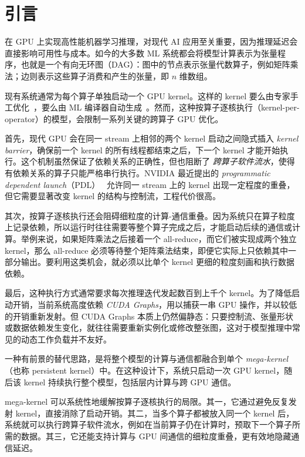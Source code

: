 \section{引言}
\label{sec:intro}
在 GPU 上实现高性能机器学习推理，对现代 AI 应用至关重要，因为推理延迟会直接影响可用性与成本。如今的大多数 ML 系统都会将模型计算表示为张量程序，也就是一个有向无环图（DAG）：图中的节点表示张量代数算子，例如矩阵乘法；边则表示这些算子消费和产生的张量，即 $n$ 维数组。

现有系统通常为每个算子单独启动一个 GPU kernel。这样的 kernel 要么由专家手工优化~\cite{dao2023flash, ye2025flashinfer}，要么由 ML 编译器自动生成~\cite{tillet2019triton, tvm, wu2025mirage}。然而，这种按算子逐核执行（kernel-per-operator）的模型，会限制一系列关键的跨算子 GPU 优化。

首先，现代 GPU 会在同一 stream 上相邻的两个 kernel 启动之间隐式插入 {\em kernel barrier}，确保前一个 kernel 的所有线程都结束之后，下一个 kernel 才能开始执行。这个机制虽然保证了依赖关系的正确性，但也阻断了 {\em 跨算子软件流水}，使得有依赖关系的算子只能严格串行执行。NVIDIA 最近提出的 {\em programmatic dependent launch}（PDL）~\cite{nvidia-pdl} 允许同一 stream 上的 kernel 出现一定程度的重叠，但它需要显著改变 kernel 的结构与控制流，工程代价很高。

其次，按算子逐核执行还会阻碍细粒度的计算-通信重叠。因为系统只在算子粒度上记录依赖，所以运行时往往需要等整个算子完成之后，才能启动后续的通信或计算。举例来说，如果矩阵乘法之后接着一个 all-reduce，而它们被实现成两个独立 kernel，那么 all-reduce 必须等待整个矩阵乘法结束，即便它实际上只依赖其中一部分输出。要利用这类机会，就必须以比单个 kernel 更细的粒度刻画和执行数据依赖。

最后，这种执行方式通常要求每次推理迭代发起数百到上千个 kernel。为了降低启动开销，当前系统高度依赖 {\em CUDA Graphs}，用以捕获一串 GPU 操作，并以较低的开销重新发射。但 CUDA Graphs 本质上仍然偏静态：只要控制流、张量形状或数据依赖发生变化，就往往需要重新实例化或修改整张图，这对于模型推理中常见的动态工作负载并不友好。

一种有前景的替代思路，是将整个模型的计算与通信都融合到单个 {\em mega-kernel}（也称 persistent kernel）中。在这种设计下，系统只启动一次 GPU kernel，随后该 kernel 持续执行整个模型，包括层内计算与跨 GPU 通信。

mega-kernel 可以系统性地缓解按算子逐核执行的局限。其一，它通过避免反复发射 kernel，直接消除了启动开销。其二，当多个算子都被放入同一个 kernel 后，系统就可以执行跨算子软件流水，例如在当前算子仍在计算时，预取下一个算子所需的数据。其三，它还能支持计算与 GPU 间通信的细粒度重叠，更有效地隐藏通信延迟。

